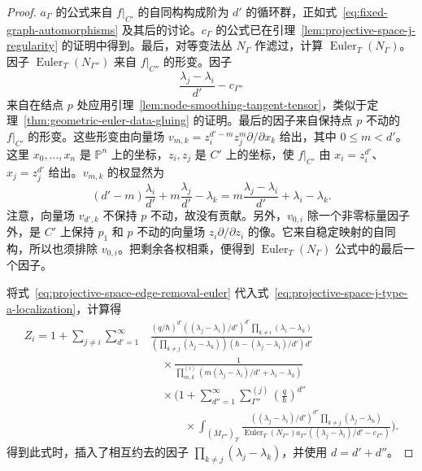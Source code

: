 \begin{proof}
$a_\Gamma$ 的公式来自 $f|_{C'}$ 的自同构构成阶为 $d'$ 的循环群，正如式~\eqref{eq:fixed-graph-automorphisms} 及其后的讨论。$c_\Gamma$ 的公式已在引理~\ref{lem:projective-space-j-regularity} 的证明中得到。最后，对等变法丛 $N_\Gamma$ 作滤过，计算 $\operatorname{Euler}_T(N_\Gamma)$。因子 $\operatorname{Euler}_T(N_{\Gamma''})$ 来自 $f|_{C''}$ 的形变。因子
\[
\frac{\lambda_j-\lambda_i}{d'}-c_{\Gamma''}
\]
来自在结点 $p$ 处应用引理~\ref{lem:node-smoothing-tangent-tensor}，类似于定理~\ref{thm:geometric-euler-data-gluing} 的证明。最后的因子来自保持点 $p$ 不动的 $f|_{C'}$ 的形变。这些形变由向量场 $v_{m,k}=z_i^{d'-m}z_j^m\partial/\partial x_k$ 给出，其中 $0\le m<d'$。这里 $x_0,\ldots,x_n$ 是 $\mathbb P^n$ 上的坐标，$z_i,z_j$ 是 $C'$ 上的坐标，使 $f|_{C'}$ 由 $x_i=z_i^{d'}$、$x_j=z_j^{d'}$ 给出。$v_{m,k}$ 的权显然为
\[
(d'-m)\frac{\lambda_i}{d'}+m\frac{\lambda_j}{d'}-\lambda_k
=m\frac{\lambda_j-\lambda_i}{d'}+\lambda_i-\lambda_k.
\]
注意，向量场 $v_{d',k}$ 不保持 $p$ 不动，故没有贡献。另外，$v_{0,i}$ 除一个非零标量因子外，是 $C'$ 上保持 $p_1$ 和 $p$ 不动的向量场 $z_i\partial/\partial z_i$ 的像。它来自稳定映射的自同构，所以也须排除 $v_{0,i}$。把剩余各权相乘，便得到 $\operatorname{Euler}_T(N_\Gamma)$ 公式中的最后一个因子。

将式~\eqref{eq:projective-space-edge-removal-euler} 代入式~\eqref{eq:projective-space-j-type-a-localization}，计算得
\begin{equation}\label{eq:projective-space-j-recursion-factorization}
\begin{aligned}
Z_i=1+\sum_{j\ne i}\sum_{d'=1}^{\infty}
&\frac{(q/\hbar)^{d'}((\lambda_j-\lambda_i)/d')^{d'}\prod_{k\ne i}(\lambda_i-\lambda_k)}
{\left(\prod_{k\ne j}(\lambda_j-\lambda_k)\right)(\hbar-(\lambda_j-\lambda_i)/d')d'}\\
&\quad\times\frac{1}{\prod_{m,k}^{(i)}(m(\lambda_j-\lambda_i)/d'+\lambda_i-\lambda_k)}\\
&\quad\times\Biggl(1+\sum_{d''=1}^{\infty}\sum_{\Gamma''}^{(j)}\left(\frac q\hbar\right)^{d''}\\
&\qquad\quad\times\int_{(\overline M_{\Gamma''})_T}
\frac{((\lambda_j-\lambda_i)/d')^{d''}\prod_{k\ne j}(\lambda_j-\lambda_k)}
{\operatorname{Euler}_T(N_{\Gamma''})a_{\Gamma''}((\lambda_j-\lambda_i)/d'-c_{\Gamma''})}\Biggr).
\end{aligned}
\end{equation}
得到此式时，插入了相互约去的因子 $\prod_{k\ne j}(\lambda_j-\lambda_k)$，并使用 $d=d'+d''$。


\end{proof}
